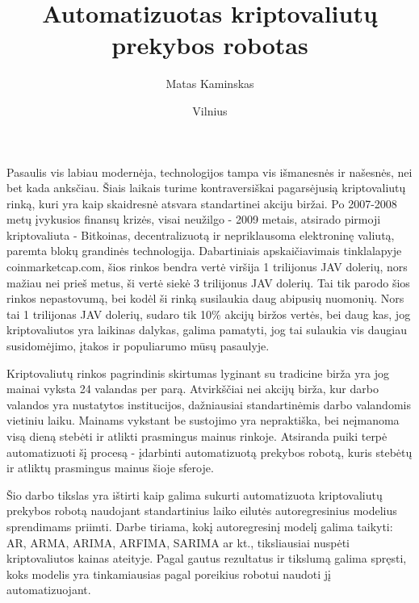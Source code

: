 \documentclass{VUMIFInfKursinis}
\institute{Informatikos institutas}  %
\title{Automatizuotas kriptovaliutų prekybos robotas}
\author{Matas Kaminskas}
\date{Vilnius \\ \the\year}
\begin{document}
\maketitle

\tableofcontents

Pasaulis vis labiau modernėja, technologijos tampa vis išmanesnės ir našesnės, nei bet kada anksčiau. Šiais laikais turime kontraversiškai pagarsėjusią
kriptovaliutų rinką, kuri yra kaip skaidresnė atsvara standartinei akciju biržai. Po 2007-2008 metų įvykusios finansų krizės,
visai neužilgo - \cite{SatBitcoin}2009 metais, atsirado pirmoji kriptovaliuta - Bitkoinas, decentralizuotą ir nepriklausoma elektroninę valiutą, paremta
blokų grandinės technologija. Dabartiniais apskaičiavimais tinklalapyje coinmarketcap.com, šios rinkos bendra vertė viršija 1 trilijonus JAV dolerių,
nors mažiau nei prieš metus, ši vertė siekė 3 trilijonus JAV dolerių. Tai tik parodo šios rinkos nepastovumą, bei kodėl ši rinką susilaukia
daug abipusių nuomonių. Nors tai 1 trilijonas JAV dolerių, sudaro tik 10\% akcijų biržos vertės, bei daug kas, jog kriptovaliutos yra laikinas dalykas,
galima pamatyti, jog tai sulaukia vis daugiau susidomėjimo, įtakos ir populiarumo mūsų pasaulyje.    

Kriptovaliutų rinkos pagrindinis skirtumas lyginant su tradicine birža yra jog mainai vyksta 24 valandas per parą. Atvirkščiai nei akcijų birža, kur
darbo valandos yra nustatytos institucijos, dažniausiai standartinėmis darbo valandomis vietiniu laiku. Mainams vykstant be sustojimo yra nepraktiška,
bei neįmanoma visą dieną stebėti ir atlikti prasmingus mainus rinkoje. Atsiranda puiki terpė automatizuoti šį procesą - įdarbinti automatizuotą prekybos
robotą, kuris stebėtų ir atliktų prasmingus mainus šioje sferoje.

Šio darbo tikslas yra ištirti kaip galima sukurti automatizuota kriptovaliutų prekybos robotą naudojant standartinius laiko eilutės autoregresinius modelius
sprendimams priimti. Darbe tiriama, kokį autoregresinį modelį galima taikyti: AR, ARMA, ARIMA, ARFIMA, SARIMA ar kt., tiksliausiai nuspėti kriptovaliutos
kainas ateityje. Pagal gautus rezultatus ir tikslumą galima spręsti, koks modelis yra tinkamiausias pagal poreikius robotui naudoti jį automatizuojant.
\end{document}
